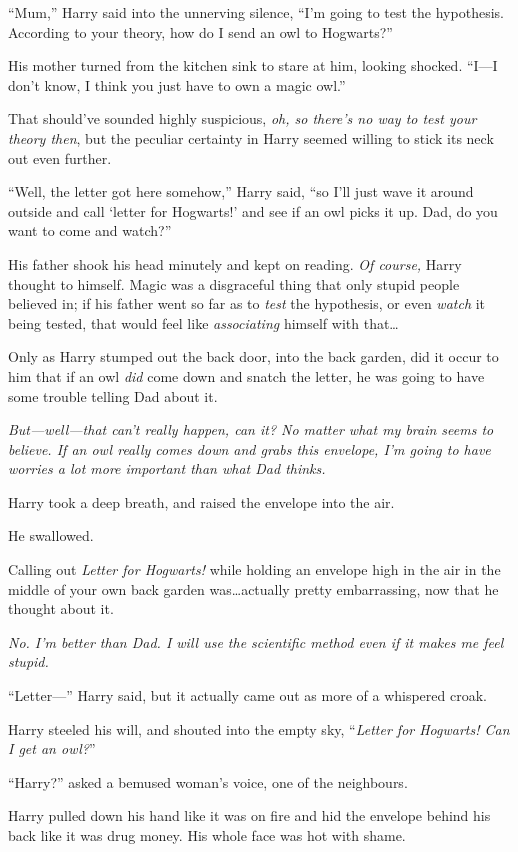 “Mum,” Harry said into the unnerving silence, “I’m going to test the hypothesis. According to your theory, how do I send an owl to Hogwarts?”

His mother turned from the kitchen sink to stare at him, looking shocked. “I—I don’t know, I think you just have to own a magic owl.”

That should’ve sounded highly suspicious, \emph{oh, so there’s no way to test your theory then}, but the peculiar certainty in Harry seemed willing to stick its neck out even further.

“Well, the letter got here somehow,” Harry said, “so I’ll just wave it around outside and call ‘letter for Hogwarts!’ and see if an owl picks it up. Dad, do you want to come and watch?”

His father shook his head minutely and kept on reading. \emph{Of course,} Harry thought to himself. Magic was a disgraceful thing that only stupid people believed in; if his father went so far as to \emph{test} the hypothesis, or even \emph{watch} it being tested, that would feel like \emph{associating} himself with that…

Only as Harry stumped out the back door, into the back garden, did it occur to him that if an owl \emph{did} come down and snatch the letter, he was going to have some trouble telling Dad about it.

\emph{But—well—that can’t \emph{really} happen, can it? No matter what my brain seems to believe. If an owl really comes down and grabs this envelope, I’m going to have worries a lot more important than what Dad thinks.}

Harry took a deep breath, and raised the envelope into the air.

He swallowed.

Calling out \emph{Letter for Hogwarts!} while holding an envelope high in the air in the middle of your own back garden was…actually pretty embarrassing, now that he thought about it.

\emph{No. I’m better than Dad. I will use the scientific method even if it makes me feel stupid.}

“Letter—” Harry said, but it actually came out as more of a whispered croak.

Harry steeled his will, and shouted into the empty sky, “\emph{Letter for Hogwarts! Can I get an owl?}”

“Harry?” asked a bemused woman’s voice, one of the neighbours.

Harry pulled down his hand like it was on fire and hid the envelope behind his back like it was drug money. His whole face was hot with shame.

